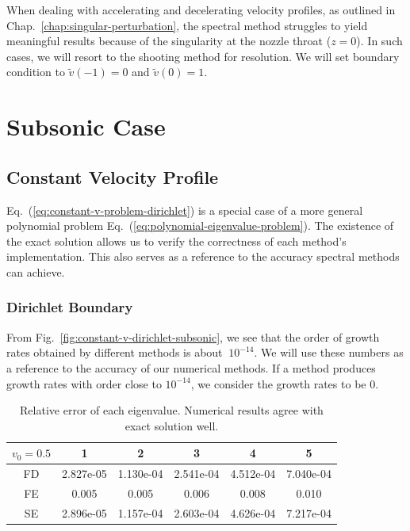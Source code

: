 When dealing with accelerating and decelerating velocity profiles, as outlined in Chap.~\ref{chap:singular-perturbation}, the spectral method struggles to yield meaningful results because of the singularity at the nozzle throat ($z=0$). In such cases, we will resort to the shooting method for resolution. We will set boundary condition to $\tilde{v}(-1) = 0$ and $\tilde{v}(0)=1$.
\section{Subsonic Case}
\subsection{Constant Velocity Profile}
Eq.~(\ref{eq:constant-v-problem-dirichlet}) is a special case of a more general polynomial problem Eq.~(\ref{eq:polynomial-eigenvalue-problem}). The existence of the exact solution allows us to verify the correctness of each method's implementation. This also serves as a reference to the accuracy spectral methods can achieve.

\subsubsection*{Dirichlet Boundary}
From Fig.~\ref{fig:constant-v-dirichlet-subsonic}, we see that the order of growth rates obtained by different methods is about $~10^{-14}$. We will use these numbers as a reference to the accuracy of our numerical methods. If a method produces growth rates with order close to $10^{-14}$, we consider the growth rates to be 0.

\begin{table} [H]
	\centering
	\caption{Relative error of each eigenvalue. Numerical results agree with exact solution well.}
	\begin{tabular}{|c|c|c|c|c|c|}
		\hline
		$v_0=0.5$ & 1         & 2         & 3         & 4         & 5         \\
		\hline
		FD        & 2.827e-05 & 1.130e-04 & 2.541e-04 & 4.512e-04 & 7.040e-04 \\
		\hline
		FE        & 0.005     & 0.005     & 0.006     & 0.008     & 0.010     \\
		\hline
		SE        & 2.896e-05 & 1.157e-04 & 2.603e-04 & 4.626e-04 & 7.217e-04 \\
		\hline
	\end{tabular}
	\label{table:eigenvalue-error-dirichlet-subsonic}
\end{table}

